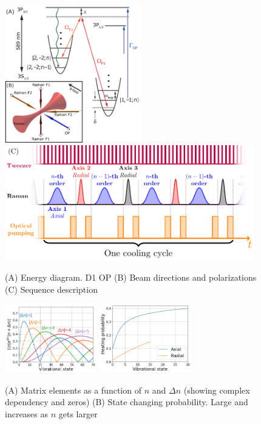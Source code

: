 \documentclass[aps,prl,twocolumn,groupedaddress]{revtex4-1}
\begin{document}
\begin{figure}
  \includegraphics[height=6cm]{imgs/Na_RSC_schematic.pdf}
  \includegraphics[height=5cm]{sequence.pdf}
  \caption{(A) Energy diagram. D1 OP
    (B) Beam directions and polarizations
    (C) Sequence description
    \label{f-setup}}
\end{figure}
\begin{figure}
  \includegraphics[width=4cm]{imgs/coupling_ax.png}
  \includegraphics[width=4cm]{imgs/heating_op.png}
  \caption{(A) Matrix elements as a function of $n$ and $\Delta n$ (showing complex dependency and zeros) (B) State changing probability. Large and increases as $n$ gets larger
    \label{f-ld}}
\end{figure}
\end{document}
